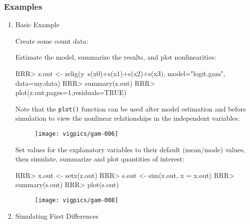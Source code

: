 \subsubsection{Examples}
\begin{enumerate}
\item Basic Example

Create some count data:

\begin{Schunk}
\end{Schunk}

Estimate the model, summarize the results, and plot nonlinearities:

\begin{Schunk}
\begin{Sinput}
RRR> z.out <- zelig(y~s(x0)+s(x1)+s(x2)+s(x3), model="logit.gam", data=my.data)
RRR> summary(z.out)
RRR> plot(z.out,pages=1,residuals=TRUE)
\end{Sinput}
\end{Schunk}
Note that the {\tt plot()} function can be used after model estimation and before simulation to view the nonlinear relationships in the independent variables: 

\begin{figure}[here]
\centering
\texttt{[image: vigpics/gam-006]}
\label{fig:plotgam}
\end{figure}

Set values for the explanatory variables to their default (mean/mode) values, then simulate, summarize and plot quantities of interest:
\begin{Schunk}
\begin{Sinput}
RRR>  x.out <- setx(z.out)
RRR>  s.out <- sim(z.out, x = x.out) 
RRR>  summary(s.out) 
RRR>  plot(s.out) 
\end{Sinput}
\end{Schunk}

\begin{figure}[here]
\centering
\texttt{[image: vigpics/gam-008]}
\label{fig:plotgam}
\end{figure}

\item Simulating First Differences


\end{enumerate}
